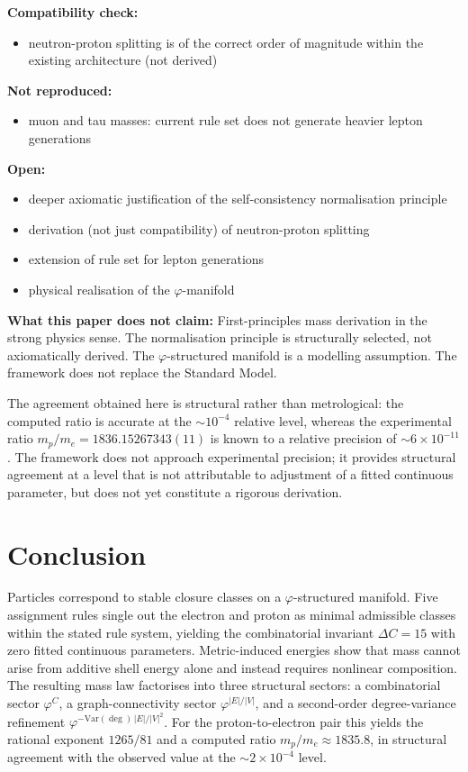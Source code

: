 \documentclass[12pt]{article}
\newcommand{\phig}{\varphi}
\begin{document}
\textbf{Compatibility check:}
\begin{itemize}
    \item neutron-proton splitting is of the correct order of magnitude within the existing architecture (not derived)
\end{itemize}

\textbf{Not reproduced:}
\begin{itemize}
    \item muon and tau masses: current rule set does not generate heavier lepton generations
\end{itemize}

\textbf{Open:}
\begin{itemize}
    \item deeper axiomatic justification of the self-consistency normalisation principle
    \item derivation (not just compatibility) of neutron-proton splitting
    \item extension of rule set for lepton generations
    \item physical realisation of the $\phig$-manifold
\end{itemize}

\textbf{What this paper does not claim:} First-principles mass derivation in the strong physics sense. The normalisation principle is structurally selected, not axiomatically derived. The $\phig$-structured manifold is a modelling assumption. The framework does not replace the Standard Model.

The agreement obtained here is structural rather than metrological: the computed ratio is accurate at the $\sim\!10^{-4}$ relative level, whereas the experimental ratio $m_p/m_e = 1836.15267343(11)$ is known to a relative precision of $\sim\!6 \times 10^{-11}$. The framework does not approach experimental precision; it provides structural agreement at a level that is not attributable to adjustment of a fitted continuous parameter, but does not yet constitute a rigorous derivation.

\section{Conclusion}\label{sec:conclusion}

Particles correspond to stable closure classes on a $\phig$-structured manifold. Five assignment rules single out the electron and proton as minimal admissible classes within the stated rule system, yielding the combinatorial invariant $\Delta C = 15$ with zero fitted continuous parameters. Metric-induced energies show that mass cannot arise from additive shell energy alone and instead requires nonlinear composition. The resulting mass law factorises into three structural sectors: a combinatorial sector $\phig^C$, a graph-connectivity sector $\phig^{|E|/|V|}$, and a second-order degree-variance refinement $\phig^{-\mathrm{Var}(\deg)\,|E|/|V|^2}$. For the proton-to-electron pair this yields the rational exponent $1265/81$ and a computed ratio $m_p/m_e \approx 1835.8$, in structural agreement with the observed value at the $\sim\!2 \times 10^{-4}$ level.
\end{document}
